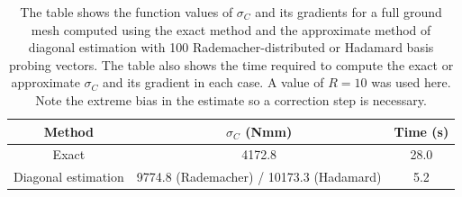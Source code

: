 \begin{table}
 \centering
 \caption{The table shows the function values of $\sigma_C$ and its gradients for a full ground mesh computed using the exact method and the approximate method of diagonal estimation with 100 Rademacher-distributed or Hadamard basis probing vectors. The table also shows the time required to compute the exact or approximate $\sigma_C$ and its gradient in each case. A value of $R = 10$ was used here. Note the extreme bias in the estimate so a correction step is necessary.}
 \begin{tabular}{|c|c|c|}
  \hline
  Method & $\sigma_C$ (Nmm) & Time (s) \\
  \hline
  \hline
  Exact & 4172.8 & 28.0 \\
  \hline
  Diagonal estimation & 9774.8 (Rademacher) / 10173.3 (Hadamard) & 5.2 \\
  \hline
 \end{tabular}
 \label{tab:time_std}
\end{table}

